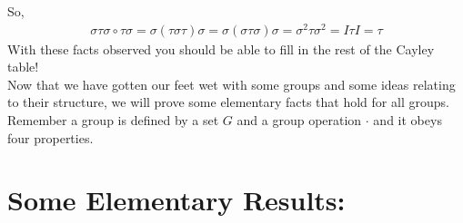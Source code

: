 So,
\begin{align}
    \sigma\tau\sigma \circ \tau\sigma = \sigma(\tau\sigma\tau)\sigma= \sigma(\sigma\tau\sigma)\sigma=\sigma^2\tau\sigma^2=I\tau I=\tau \nonumber 
\end{align}
With these facts observed you should be able to fill in the rest of the Cayley table!\steezybreak\\
Now that we have gotten our feet wet with some groups and some ideas relating to their structure, we will prove some elementary facts that hold for all groups. Remember a group is defined by a set $G$ and a group operation $\cdot$ and it obeys four properties.\vspace{-0.5cm}
\section{Some Elementary Results:} 
